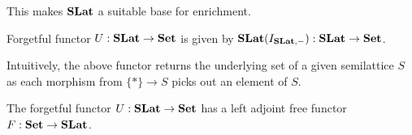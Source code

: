 This makes $\mathbf{SLat}$ a suitable base for enrichment.

\begin{definition}
	Forgetful functor $U : \mathbf{SLat} \to \mathbf{Set}$ is given by $\mathbf{SLat}(I_{\mathbf{SLat}, -}) : \mathbf{SLat} \to \mathbf{Set}$.
\end{definition}

Intuitively, the above functor returns the underlying set of a given semilattice $S$ as each morphism from $\{*\} \to S$ picks out an element of $S$.

\begin{proposition}
	The forgetful functor $U : \mathbf{SLat} \to \mathbf{Set}$ has a left adjoint free functor $F : \mathbf{Set} \to \mathbf{SLat}$.
\end{proposition}
